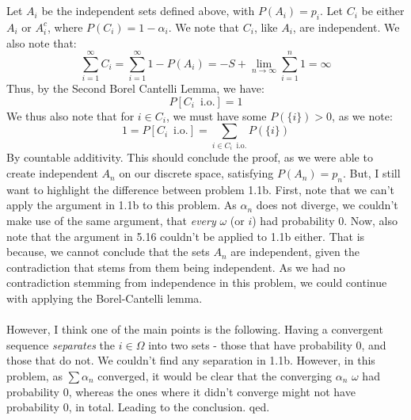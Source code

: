 \documentclass[12pt,a4paper]{article}
\newcommand{\1}[1]{\mathbbm{1}\left\{ #1 \right\}}
\newcommand{\io}{\text{i.o.}}
\begin{document}
\\\\
Let $A_i$ be the independent sets defined above, with $P(A_i) = p_i$. Let $C_i$ be either $A_i$ or $A_i^c$, where $P(C_i) = 1 - \alpha_i$. We note that $C_i$, like $A_i$, are independent. We also note that:
$$
	\sum_{i=1}^\infty C_i = \sum_{i=1}^\infty 1 - P(A_i) = -S + \lim_{n \to \infty} \sum_{i=1}^n 1 = \infty
$$
Thus, by the Second Borel Cantelli Lemma, we have:
$$
	P[C_i \,\,\, \io] = 1
$$
We thus also note that for $i \in C_i$, we must have some $P(\{i\}) > 0$, as we note:
$$
	1 = P[C_i \,\,\, \io] = \sum_{i \in C_i \,\,\, \io} P(\{i\})
$$
By countable additivity. This should conclude the proof, as we were able to create independent $A_n$ on our discrete space, satisfying $P(A_n) = p_n$. But, I still want to highlight the difference between problem 1.1b. First, note that we can't apply the argument in 1.1b to this problem. As $\alpha_n$ does not diverge, we couldn't make use of the same argument, that \textit{every} $\omega$ (or $i$) had probability $0$. Now, also note that the argument in 5.16 couldn't be applied to 1.1b either. That is because, we cannot conclude that the sets $A_n$ are independent, given the contradiction that stems from them being independent. As we had no contradiction stemming from independence in this problem, we could continue with applying the Borel-Cantelli lemma.
\\\\
However, I think one of the main points is the following. Having a convergent sequence \textit{separates} the $i \in \Omega$ into two sets - those that have probability $0$, and those that do not. We couldn't find any separation in 1.1b. However, in this problem, as $\sum \alpha_n$ converged, it would be clear that the converging $\alpha_n$ $\omega$ had probability $0$, whereas the ones where it didn't converge might not have probability $0$, in total. Leading to the conclusion. qed.
\end{document}
